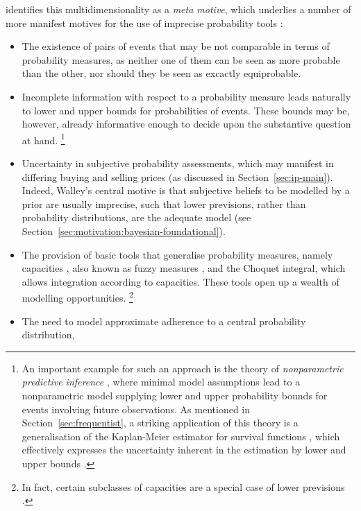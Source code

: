 \textcite[\S 1.4]{2001:weichselberger} identifies this multidimensionality as a \emph{meta motive},
which underlies a number of more manifest motives for the use of imprecise probability tools
\parencite[p.~92]{2001:weichselberger}:
\begin{itemize}
\item The existence of pairs of events that may be not comparable in terms of probability measures,
as neither one of them can be seen as more probable than the other,
nor should they be seen as excactly equiprobable.
\item Incomplete information with respect to a probability measure
leads naturally to lower and upper bounds for probabilities of events.
These bounds may be, however, already informative enough to decide upon
the substantive question at hand.%
\footnote{\label{foot:npi}An important example for such an approach is the theory of \emph{nonparametric predictive inference}
\parencite[NPI, see, e.g., ][]{2011:IESS-npi},
where minimal model assumptions %
lead to a nonparametric model supplying lower and upper probability bounds for events
involving future observations.
As mentioned in Section~\ref{sec:frequentist}, a striking application of this theory is a generalisation of the
Kaplan-Meier estimator for survival functions \parencite{1958:kaplan},
which effectively expresses the uncertainty inherent in the estimation
by lower and upper bounds \parencite{2004:Coolen:Yan}.}
\item Uncertainty in subjective probability assessments,
which may manifest in differing buying and selling prices
(as discussed in Section~\ref{sec:ip-main}).
Indeed, Walley's \parencite*{1991:walley} central motive is that
subjective beliefs to be modelled by a prior are usually imprecise,
such that lower previsions, rather than probability distributions,
are the adequate model (see Section~\ref{sec:motivation:bayesian-foundational}).
\item The provision of basic tools that generalise probability measures,
namely capacities \parencite{1954:choquet}, also known as fuzzy measures \parencite[e.g.,][]{1989:murofushi},
and the Choquet integral, which allows integration according to capacities.
These tools open up a wealth of modelling opportunities.%
\footnote{In fact, certain subclasses of capacities are a special case of lower previsions \parencite[see, e.g.,][Fig.~5.5]{itip-special}.}
\item The need to model approximate adherence to a central probability distribution,

\end{itemize}
